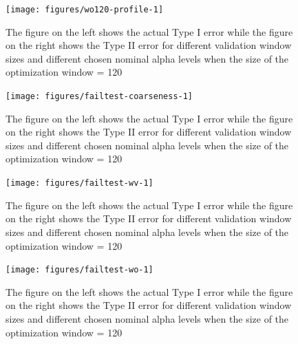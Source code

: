 \documentclass[12pt]{article}
\begin{document}
\begin{figure}

{\centering \texttt{[image: figures/wo120-profile-1]} 

}

\caption{The figure on the left shows the actual Type I error while the figure on the right shows the Type II error for different validation window sizes and different chosen nominal alpha levels when the size of the optimization window = 120}\label{fig:wo120-profile}
\end{figure}\begin{figure}

{\centering \texttt{[image: figures/failtest-coarseness-1]} 

}

\caption{The figure on the left shows the actual Type I error while the figure on the right shows the Type II error for different validation window sizes and different chosen nominal alpha levels when the size of the optimization window = 120}\label{fig:failtest-coarseness}
\end{figure}\begin{figure}

{\centering \texttt{[image: figures/failtest-wv-1]} 

}

\caption{The figure on the left shows the actual Type I error while the figure on the right shows the Type II error for different validation window sizes and different chosen nominal alpha levels when the size of the optimization window = 120}\label{fig:failtest-wv}
\end{figure}\begin{figure}

{\centering \texttt{[image: figures/failtest-wo-1]} 

}

\caption{The figure on the left shows the actual Type I error while the figure on the right shows the Type II error for different validation window sizes and different chosen nominal alpha levels when the size of the optimization window = 120}\label{fig:failtest-wo}
\end{figure}



\end{document}
